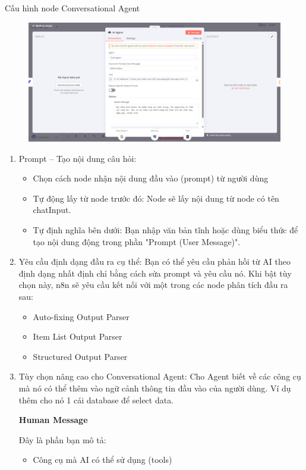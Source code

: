 Cấu hình node Conversational Agent

\begin{figure}[htbp]
    \centering
    \includegraphics[width=0.5\linewidth]{Chap1-7/Agent-a.pdf}
\end{figure}

\begin{enumerate}
    \item Prompt – Tạo nội dung câu hỏi: 
    
    \begin{itemize}
        \item Chọn cách node nhận nội dung đầu vào (prompt) từ người dùng
        \item Tự động lấy từ node trước đó: Node sẽ lấy nội dung từ node có tên chatInput.
        \item Tự định nghĩa bên dưới: Bạn nhập văn bản tĩnh hoặc dùng biểu thức để tạo nội dung động trong phần "Prompt (User Message)".
    \end{itemize}

    \item Yêu cầu định dạng đầu ra cụ thể: Bạn có thể yêu cầu phản hồi từ AI theo định dạng nhất định chỉ bằng cách sửa prompt và yêu cầu nó. Khi bật tùy chọn này, n8n sẽ yêu cầu kết nối với một trong các node phân tích đầu ra sau:
    \begin{itemize}
        \item Auto-fixing Output Parser

        \item Item List Output Parser

        \item Structured Output Parser
    \end{itemize}

    \item Tùy chọn nâng cao cho Conversational Agent: Cho Agent biết về các công cụ  mà nó có thể thêm vào ngữ cảnh thông tin đầu vào của người dùng. Ví dụ thêm cho nó 1 cái database để select data.

\textbf{Human Message}

Đây là phần bạn mô tả:
\begin{itemize}
    \item Công cụ mà AI có thể sử dụng ({tools})


\end{itemize}
\end{enumerate}
